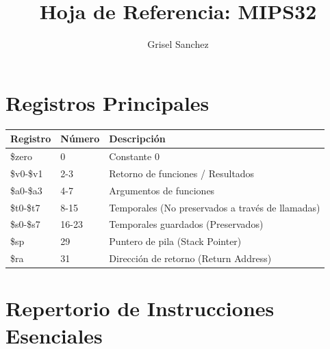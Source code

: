 \documentclass[11pt, a4paper]{article}
\title{\textbf{Hoja de Referencia: MIPS32}}
\author{Grisel Sanchez}
\date{}
\begin{document}
\maketitle

\section*{Registros Principales}

\begin{table}[h]
    \centering
    \renewcommand{\arraystretch}{1.1}
    \begin{tabularx}{\textwidth}{@{} l l X @{}}
        \toprule
        \textbf{Registro} & \textbf{Número} & \textbf{Descripción} \\
        \midrule
        \$zero & 0 & Constante 0 \\
        \$v0-\$v1 & 2-3 & Retorno de funciones / Resultados \\
        \$a0-\$a3 & 4-7 & Argumentos de funciones \\
        \$t0-\$t7 & 8-15 & Temporales (No preservados a través de llamadas) \\
        \$s0-\$s7 & 16-23 & Temporales guardados (Preservados) \\
        \$sp & 29 & Puntero de pila (Stack Pointer) \\
        \$ra & 31 & Dirección de retorno (Return Address) \\
        \bottomrule
    \end{tabularx}
\end{table}

\section*{Repertorio de Instrucciones Esenciales}
\end{document}

